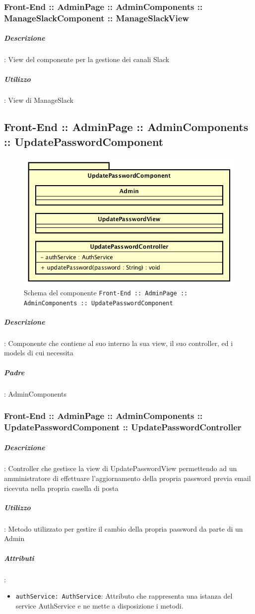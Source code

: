 \documentclass[../ManualeSviluppatore_v1.0.0.tex]{subfiles}
\begin{document}
		      	\subsubsection{Front-End :: AdminPage :: AdminComponents :: ManageSlackComponent :: ManageSlackView}
					\subparagraph{Descrizione}: View del componente per la gestione dei canali Slack
					\subparagraph{Utilizzo}: View di ManageSlack

	\newpage
	\subsection{Front-End :: AdminPage :: AdminComponents :: UpdatePasswordComponent}
	\begin{figure}[!h]
		\centering
		\includegraphics[scale=0.6]{Architettura/Front-End/AdminPage/AdminComponents/UpdatePasswordComponent.png}
		\caption{Schema del componente \texttt{Front-End :: AdminPage :: AdminComponents :: UpdatePasswordComponent}}
	\end{figure}

			\subparagraph{Descrizione}: Componente che contiene al suo interno la sua view, il suo controller, ed i models di cui necessita
			\subparagraph{Padre}: AdminComponents
				\subsubsection{Front-End :: AdminPage :: AdminComponents :: UpdatePasswordComponent :: UpdatePasswordController}
					\subparagraph{Descrizione}: Controller che gestisce la view di UpdatePasswordView permettendo ad un amministratore di effettuare l'aggiornamento della propria password previa email ricevuta nella propria casella di posta
					\subparagraph{Utilizzo}: Metodo utilizzato per gestire il cambio della propria password da parte di un Admin
					\subparagraph{Attributi}:
					\begin{itemize}
						\item \texttt{authService: AuthService}: Attributo che rappresenta una istanza del service AuthService e ne mette a disposizione i metodi.
					\end{itemize}
\end{document}
